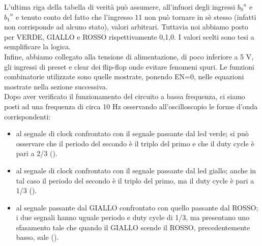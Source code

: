 L'ultima riga della tabella di verità può assumere, all'infuori degli ingressi ${b_0}^{n}$ e ${b_1}^{n}$ e tenuto conto del fatto che l'ingresso 11 non può tornare in sè stesso (infatti non corrisponde ad alcuno stato), valori arbitrari. Tuttavia noi abbiamo posto per VERDE, GIALLO e ROSSO rispettivamente 0,1,0. I valori scelti sono tesi a semplificare la logica.\\ Infine, abbiamo collegato alla tensione di alimentazione, di poco inferiore a 5 V, gli ingressi di preset e clear dei flip-flop onde evitare fenomeni spuri. Le funzioni combinatorie utilizzate sono quelle mostrate, ponendo EN=0, nelle equazioni mostrate nella sezione successiva.\\
Dopo aver verificato il funzionamento del circuito a bassa frequenza, ci siamo posti ad una frequenza di circa 10 Hz osservando all'oscilloscopio le forme d'onda corrispondenti:
\begin{itemize}
\item al segnale di clock confrontato con il segnale passante dal led verde; si può osservare che il periodo del secondo è il triplo del primo e che il duty cycle è pari a 2/3 ().
\item al segnale di clock confrontato con il segnale passante dal led giallo; anche in tal caso il periodo del secondo è il triplo del primo, ma il duty cycle è pari a 1/3 ().
\item al segnale passante dal GIALLO confrontato con quello passante dal ROSSO; i due segnali hanno uguale periodo e duty cycle di 1/3, ma presentano uno sfasamento tale che quando il GIALLO scende il ROSSO, precedentemente basso, sale ().
\end{itemize}


